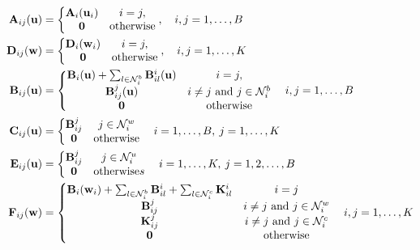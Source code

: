 \begin{subequations}
    \begin{align}
        \mathbf{A}_{ij}(\mathbf{u}) &= \left\{\begin{matrix}
            \mathbf{A}_i(\mathbf{u}_i) & i=j,\\
            \mathbf{0} & \text{otherwise}
        \end{matrix}\right.,\quad i,j=1,\dots,B\\
        \mathbf{D}_{ij}(\mathbf{w}) &= \left\{\begin{matrix}
            \mathbf{D}_i(\mathbf{w}_i) & i=j,\\
            \mathbf{0} & \text{otherwise}
        \end{matrix}\right.,\quad i,j=1,\dots,K\\
        \mathbf{B}_{ij}(\mathbf{u}) &= \left\{
            \begin{matrix}
                \mathbf{B}_i(\mathbf{u}) + \sum_{l\in\mathcal{N}^b_i}\mathbf{B}_{il}^{i}(\mathbf{u}) & i=j,\\
                \mathbf{B}_{ij}^{j}(\mathbf{u}) & i\neq j \text{ and } j\in\mathcal{N}_i^b\\
                \mathbf{0} & \text{otherwise}
            \end{matrix}
        \right.\quad i,j=1,\dots,B\\
        \mathbf{C}_{ij}(\mathbf{u}) &= \left\{\begin{matrix}
            \mathbf{B}_{ij}^{j} & j\in\mathcal{N}_i^w\\
            \mathbf{0} & \text{otherwise}
        \end{matrix}\right.\quad i=1,\dots,B, \: j=1,\dots,K\\
        \mathbf{E}_{ij}(\mathbf{u}) &= \left\{\begin{matrix}
            \mathbf{B}_{ij}^{j} & j\in\mathcal{N}_i^{u}\\
            \mathbf{0} & \text{otherwise}s
        \end{matrix}
        \right.\quad i=1,\dots,K,\: j=1,2,\dots,B\\
        \mathbf{F}_{ij}(\mathbf{w}) &= \left\{\begin{matrix}
            \mathbf{B}_i(\mathbf{w}_i) + \sum_{l\in\mathcal{N}_i^b}\mathbf{B}_{il}^{i} + \sum_{l\in\mathcal{N}_i^c}\mathbf{K}_{il}^{i} & i=j\\
            \mathbf{B}_{ij}^{j} & i\neq j \text{ and } j\in\mathcal{N}_i^w\\
            \mathbf{K}_{ij}^{j} & i\neq j \text{ and } j\in\mathcal{N}_{i}^{c}\\
            \mathbf{0} & \text{otherwise}
        \end{matrix}
        \right.\quad i,j=1,\dots,K
    \end{align}
\end{subequations}

